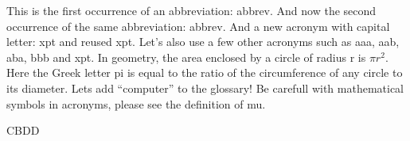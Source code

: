 This is the first occurrence of an abbreviation: \gls{abbrev}. And now the second occurrence of the same abbreviation: \gls{abbrev}. And a new acronym with capital letter: \Gls{xpt} and reused \gls{xpt}.  Let's also use a few other acronyms such as \gls{aaa}, \gls{aab}, \gls{aba}, \gls{bbb} and \gls{xpt}.
In geometry, the area enclosed by a circle of radius \gls{r} is $\pi r^2$. Here the Greek letter \gls{pi} is equal to the ratio of the circumference of any circle to its diameter.
Lets add ``\gls{computer}'' to the glossary! Be carefull with mathematical symbols in acronyms, please see the definition of \gls{mu}.

\gls{CBDD}
